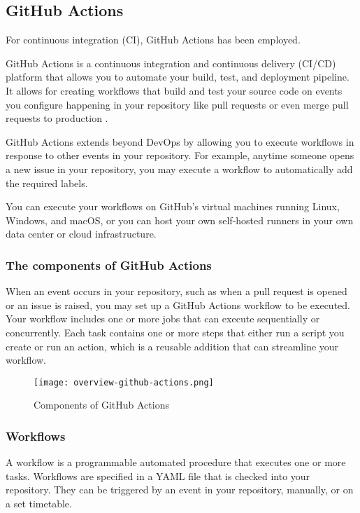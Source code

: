 \subsection{GitHub Actions}
For continuous integration (CI), GitHub Actions has been employed.

GitHub Actions is a continuous integration and continuous delivery (CI/CD) platform that allows you to automate your build, test, and deployment pipeline. It allows for creating workflows that build and test your source code on events you configure happening in your repository like pull requests or even merge pull requests to production \cite{githubactions}.

GitHub Actions extends beyond DevOps by allowing you to execute workflows in response to other events in your repository. For example, anytime someone opens a new issue in your repository, you may execute a workflow to automatically add the required labels.

You can execute your workflows on GitHub's virtual machines running Linux, Windows, and macOS, or you can host your own self-hosted runners in your own data center or cloud infrastructure.

\subsubsection{The components of GitHub Actions}
When an event occurs in your repository, such as when a pull request is opened or an issue is raised, you may set up a GitHub Actions workflow to be executed. Your workflow includes one or more jobs that can execute sequentially or concurrently. Each task contains one or more steps that either run a script you create or run an action, which is a reusable addition that can streamline your workflow.

\begin{figure}[H]
  \centering
  \texttt{[image: overview-github-actions.png]}
  \caption[Components of GitHub Actions]{Components of GitHub Actions \cite{githubactions}}
  \label{github actions}
\end{figure}

\subsubsection{Workflows}
A workflow is a programmable automated procedure that executes one or more tasks. Workflows are specified in a YAML file that is checked into your repository. They can be triggered by an event in your repository, manually, or on a set timetable.

